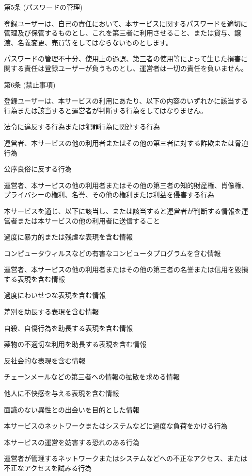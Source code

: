 第5条 (パスワードの管理)

    登録ユーザーは、自己の責任において、本サービスに関するパスワードを適切に管理及び保管するものとし、これを第三者に利用させること、または貸与、譲渡、名義変更、売買等をしてはならないものとします。

    パスワードの管理不十分、使用上の過誤、第三者の使用等によって生じた損害に関する責任は登録ユーザーが負うものとし、運営者は一切の責任を負いません。

第6条 (禁止事項)

    登録ユーザーは、本サービスの利用にあたり、以下の内容のいずれかに該当する行為または該当すると運営者が判断する行為をしてはなりません。

    法令に違反する行為または犯罪行為に関連する行為

    運営者、本サービスの他の利用者またはその他の第三者に対する詐欺または脅迫行為

        公序良俗に反する行為

        運営者、本サービスの他の利用者またはその他の第三者の知的財産権、肖像権、プライバシーの権利、名誉、その他の権利または利益を侵害する行為

        本サービスを通じ、以下に該当し、または該当すると運営者が判断する情報を運営者または本サービスの他の利用者に送信すること

        過度に暴力的または残虐な表現を含む情報

        コンピュータウィルスなどの有害なコンピュータプログラムを含む情報

        運営者、本サービスの他の利用者またはその他の第三者の名誉または信用を毀損する表現を含む情報

        過度にわいせつな表現を含む情報

        差別を助長する表現を含む情報

        自殺、自傷行為を助長する表現を含む情報

        薬物の不適切な利用を助長する表現を含む情報

        反社会的な表現を含む情報

        チェーンメールなどの第三者への情報の拡散を求める情報

        他人に不快感を与える表現を含む情報

        面識のない異性との出会いを目的とした情報

    本サービスのネットワークまたはシステムなどに過度な負荷をかける行為

    本サービスの運営を妨害する恐れのある行為

    運営者が管理するネットワークまたはシステムなどへの不正なアクセス、または不正なアクセスを試みる行為

